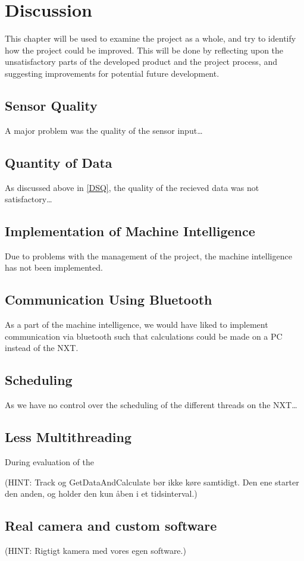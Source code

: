 \chapter{Discussion}\label{projDiscus}
This chapter will be used to examine the project as a whole, and try to identify
how the project could be improved. This will be done by reflecting upon the
unsatisfactory parts of the developed product and the project process, and
suggesting improvements for potential future development.

\section{Sensor Quality}\label{DSQ}
A major problem was the quality of the sensor input\ldots

\section{Quantity of Data}
As discussed above in \autoref{DSQ}, the quality of the recieved data was not
satisfactory\ldots

\section{Implementation of Machine Intelligence}
Due to problems with the management of the project, the machine intelligence has
not been implemented.

\section{Communication Using Bluetooth}
As a part of the machine intelligence, we would have liked to implement
communication via bluetooth such that calculations could be made on a PC instead
of the NXT.

\section{Scheduling}
As we have no control over the scheduling of the different threads on the NXT\ldots

\section{Less Multithreading}
During evaluation of the

(HINT: Track og GetDataAndCalculate bør ikke køre samtidigt. Den ene starter
  den anden, og holder den kun åben i et tidsinterval.) 
  
\section{Real camera and custom software}
(HINT: Rigtigt kamera med vores egen software.)
